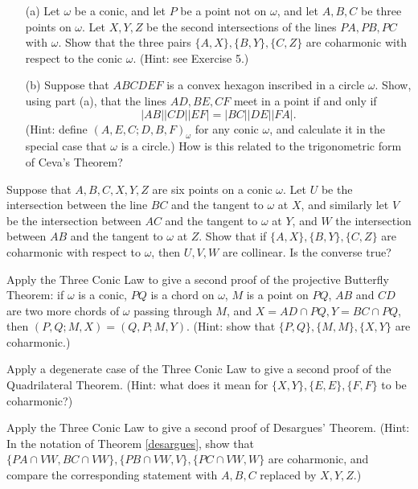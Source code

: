 \begin{exer}
\begin{itemize}
\item[(a)] Let $\omega$ be a conic, and let $P$ be a point not on $\omega$, and let $A,B,C$ be three points on $\omega$. Let $X,Y,Z$ be the second intersections of the lines $PA,PB,PC$ with $\omega$. Show that the three pairs $\{A,X\}, \{B,Y\}, \{C,Z\}$ are coharmonic with respect to the conic $\omega$. (Hint: see Exercise 5.)
\item[(b)] Suppose that $ABCDEF$ is a convex hexagon inscribed in a circle $\omega$. Show, using part (a), that the lines $AD, BE, CF$ meet in a point if and only if
\[
|AB||CD||EF| = |BC||DE||FA|.
\]
(Hint: define $(A,E,C;D,B,F)_{\omega}$ for any conic $\omega$, and calculate it in the special case that $\omega$ is a circle.) How is this related to the trigonometric form of Ceva's Theorem?
\end{itemize}
\end{exer}

\begin{exer} Suppose that $A,B,C,X,Y,Z$ are six points on a conic $\omega$. Let $U$ be the intersection between the line $BC$ and the tangent to $\omega$ at $X$, and similarly let $V$ be the intersection between $AC$ and the tangent to $\omega$ at $Y$, and $W$ the intersection between $AB$ and the tangent to $\omega$ at $Z$. Show that if $\{A,X\},\{B,Y\},\{C,Z\}$ are coharmonic with respect to $\omega$, then $U,V,W$ are collinear. Is the converse true?
\end{exer}

\begin{exer} Apply the Three Conic Law to give a second proof of the projective Butterfly Theorem: if $\omega$ is a conic, $PQ$ is a chord on $\omega$, $M$ is a point on $PQ$, $AB$ and $CD$ are two more chords of $\omega$ passing through $M$, and $X = AD\cap PQ, Y = BC\cap PQ$, then $(P,Q;M,X) = (Q,P;M,Y)$. (Hint: show that $\{P,Q\}, \{M,M\}, \{X,Y\}$ are coharmonic.)
\end{exer}

\begin{exer} Apply a degenerate case of the Three Conic Law to give a second proof of the Quadrilateral Theorem. (Hint: what does it mean for $\{X,Y\},\{E,E\},\{F,F\}$ to be coharmonic?)
\end{exer}

\begin{exer} Apply the Three Conic Law to give a second proof of Desargues' Theorem. (Hint: In the notation of Theorem \ref{desargues}, show that $\{PA\cap VW,BC\cap VW\},\{PB\cap VW, V\}, \{PC\cap VW,W\}$ are coharmonic, and compare the corresponding statement with $A,B,C$ replaced by $X,Y,Z$.)
\end{exer}

